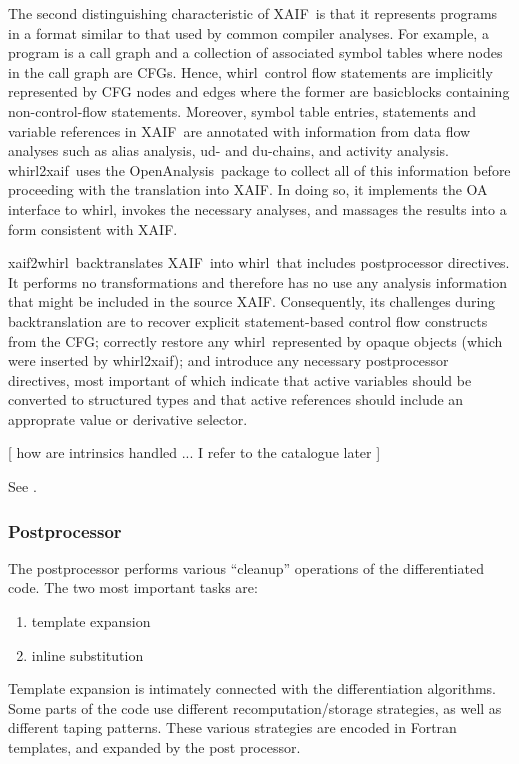\documentclass[acmtocl,acmnow]{acmtrans2m}
\newcommand{\basicblock}{basicblock}
\newcommand{\OpenAnalysis}{OpenAnalysis}
\newcommand{\xaif}{XAIF}
\newcommand{\whirl}{whirl}
\newcommand{\whirlToxaif}{whirl2xaif}
\newcommand{\xaifTowhirl}{xaif2whirl}
\begin{document}
The second distinguishing characteristic of \xaif\ is that it
represents programs in a format similar to that used by common
compiler analyses.  For example, a program is a call graph and a
collection of associated symbol tables where nodes in the call graph
are CFGs.  Hence, \whirl\ control flow statements are implicitly
represented by CFG nodes and edges where the former are {\basicblock}s
containing non-control-flow statements.  Moreover, symbol table
entries, statements and variable references in \xaif\ are annotated
with information from data flow analyses such as alias analysis, ud-
and du-chains, and activity analysis.  \whirlToxaif\ uses the
\OpenAnalysis\ package to collect all of this information before
proceeding with the translation into \xaif.  In doing so, it
implements the OA interface to \whirl, invokes the necessary analyses,
and massages the results into a form consistent with \xaif.

\xaifTowhirl\ backtranslates \xaif\ into \whirl\ that includes
postprocessor directives.  It performs no transformations and
therefore has no use any analysis information that might be included
in the source \xaif.  Consequently, its challenges during
backtranslation are to recover explicit statement-based control flow
constructs from the CFG; correctly restore any \whirl\ represented by
opaque objects (which were inserted by \whirlToxaif); and introduce
any necessary postprocessor directives, most important of which
indicate that active variables should be converted to structured types
and that active references should include an approprate value or
derivative selector.

{\color{Red} [ how are intrinsics handled ... I refer to the catalogue later  ] }

See \cite{RiceTechreport}.


\subsubsection{Postprocessor}
The postprocessor performs various ``cleanup'' operations of the
differentiated code. The two most important tasks are:
   \begin{enumerate}
      \item template expansion
      \item inline substitution
   \end{enumerate}

Template expansion is intimately connected with the differentiation
algorithms. Some parts of the code use different recomputation/storage
strategies, as well as different taping patterns. These various
strategies are encoded in Fortran templates, and expanded by the
post processor.
\end{document}

